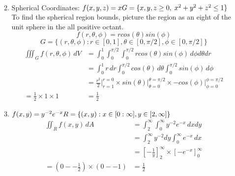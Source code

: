 \documentclass[11pt]{article}
\begin{document}
\begin{preview}
\begin{enumerate}
\begin{enumerate}
\begin{align*}
                  \end{align*}
            \item Spherical Coordinates: $f(x,y,z)=x \\ G=\{x,y,z \ge 0,\; x^{2}+y^{2}+z^{2} \le 1\}$ \\
                  To find the spherical region bounds, picture the region as an eight of the unit sphere in the all positive octant.
                  $$f(r,\theta,\phi) = r cos(\theta)sin(\phi)$$
                  $$ G = \{(r,\theta,\phi) : r \in [0,1], \theta \in [0, \pi/2], \phi \in [0, \pi/2]\}$$
                  \begin{align*}
                    \iiint_G f(r,\theta,\phi) \,dV  & = \int_{0}^{1}\int_{0}^{\pi/2}\int_{0}^{\pi/2} r cos(\theta)sin(\phi) \,d\phi d\theta dr                                        \\
                                                    & = \int_{0}^{1} r \,dr \int_{0}^{\pi/2} cos(\theta) \,d\theta \int_{0}^{\pi/2} sin(\phi) \,d\phi                                 \\
                                                    & = \frac{r^2}{2}\Big|_{r=1}^{r=0} \times sin(\theta)\Big|_{\theta=0}^{\theta=\pi/2} \times -cos(\phi)\Big|_{\phi=0}^{\phi=\pi/2} \\
                    = \frac{1}{2} \times 1 \times 1 & = \frac{1}{2}
                  \end{align*}
            \item $f(x,y)=y^{-2}e^{-x}  \\ R=\{(x,y) : x \in [0:\infty], y \in [2,\infty] \}$
                  \begin{align*}
                    \iint_{R} f(x,y) \, dA                                     & = \int_{2}^{\infty} \int_{0}^{\infty} y^{-2}e^{-x} \, dxdy                        \\
                                                                               & = \int_{2}^{\infty} y^{-2} dy \int_{0}^{\infty} e^{-x} \, dx                      \\
                                                                               & = \left[-\frac{1}{y}\right]_{2}^{\infty} \times \left[-e^{-x}\right]_{0}^{\infty} \\
                    = \left(0 - -\frac{1}{2}\right) \times \left(0 - -1\right) & = \frac{1}{2}                                                                     \\
                  \end{align*}

\end{enumerate}
\end{enumerate}
\end{preview}
\end{document}
